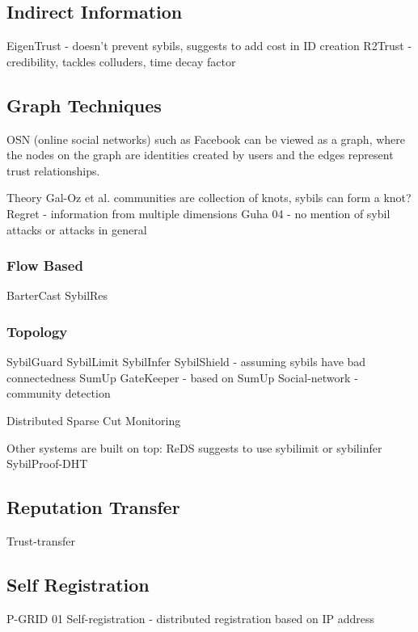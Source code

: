 \subsection{Indirect Information}
EigenTrust\cite{kamvar2003eigentrust} - doesn't prevent sybils, suggests to add cost in ID creation
R2Trust\cite{tian2011h2trust} - credibility, tackles colluders, time decay factor

\subsection{Graph Techniques}\label{sec:graph}

OSN (online social networks) such as Facebook can be viewed as a graph, where
the nodes on the graph are identities created by users and the edges represent
trust relationships.


Theory\cite{seuken2011sybil}
Gal-Oz et al. \cite{gal2008robust} communities are collection of knots, sybils can form a knot?
Regret\cite{sabater2001regret, sabater2002social} - information from multiple dimensions
Guha 04\cite{guha2004propagation} - no mention of sybil attacks or attacks in general

\subsubsection{Flow Based}
BarterCast\cite{meulpolder2009bartercast}
SybilRes\cite{delaviz2012sybilres}

\subsubsection{Topology}
SybilGuard\cite{yu2006sybilguard}
SybilLimit\cite{yu2008sybillimit}
SybilInfer\cite{danezis2009sybilinfer}
SybilShield\cite{shi2013sybilshield} - assuming sybils have bad connectedness
SumUp\cite{tran2009sybil}
GateKeeper\cite{tran2011optimal} - based on SumUp
Social-network\cite{viswanath2010analysis} - community detection

Distributed Sparse Cut Monitoring\cite{kurve2011sybil}

Other systems are built on top:
ReDS\cite{akavipat2014reds} suggests to use sybilimit or sybilinfer
SybilProof-DHT\cite{lesniewski2010whanau}
\subsection{Reputation Transfer}
Trust-transfer\cite{seigneur2005trust}

\subsection{Self Registration}
P-GRID 01\cite{aberer2001p}
Self-registration\cite{dinger2006defending} - distributed registration based on IP address

